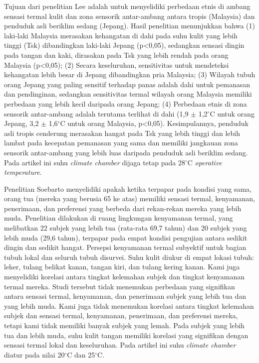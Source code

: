 Tujuan dari penelitian Lee \cite{paper21JYLee} adalah untuk menyelidiki perbedaan etnis di ambang sensasi termal kulit dan zona sensorik antar-ambang antara tropis (Malaysia) dan penduduk asli beriklim sedang (Jepang). Hasil penelitian menunjukkan bahwa (1) laki-laki Malaysia merasakan kehangatan di dahi pada suhu kulit yang lebih tinggi (Tsk) dibandingkan laki-laki Jepang (p<0,05), sedangkan sensasi dingin pada tangan dan kaki, dirasakan pada Tsk yang lebih rendah pada orang Malaysia (p<0,05); (2) Secara keseluruhan, sensitivitas untuk mendeteksi kehangatan lebih besar di Jepang dibandingkan pria Malaysia; (3) Wilayah tubuh orang Jepang yang paling sensitif terhadap panas adalah dahi untuk pemanasan dan pendinginan, sedangkan sensitivitas termal wilayah orang Malaysia memiliki perbedaan yang lebih kecil daripada orang Jepang; (4) Perbedaan etnis di zona sensorik antar-ambang adalah terutama terlihat di dahi (1,9 $\pm$ 1,2$^\circ$C untuk orang Jepang, 3,2 $\pm$ 1,6$^\circ$C untuk orang Malaysia, p<0,05). Kesimpulannya, penduduk asli tropis cenderung merasakan hangat pada Tsk yang lebih tinggi dan lebih lambat pada kecepatan pemanasan yang sama dan memiliki jangkauan zona sensorik antar-ambang yang lebih luas daripada penduduk asli beriklim sedang. Pada artikel ini suhu \textit{climate chamber} dijaga tetap pada 28$^\circ$C \textit{operative temperature}.

Penelitian Soebarto \cite{paper21Veronica} menyelidiki apakah ketika terpapar pada kondisi yang sama, orang tua (mereka yang berusia 65 ke atas) memiliki sensasi termal, kenyamanan, penerimaan, dan preferensi yang berbeda dari rekan-rekan mereka yang lebih muda. Penelitian dilakukan di ruang lingkungan kenyamanan termal, yang melibatkan 22 subjek yang lebih tua (rata-rata 69,7 tahun) dan 20 subjek yang lebih muda (29,6 tahun), terpapar pada empat kondisi pengujian antara sedikit dingin dan sedikit hangat. Persepsi kenyamanan termal subyektif untuk bagian tubuh lokal dan seluruh tubuh disurvei. Suhu kulit diukur di empat lokasi tubuh: leher, tulang belikat kanan, tangan kiri, dan tulang kering kanan. Kami juga menyelidiki korelasi antara tingkat kelemahan subjek dan tingkat kenyamanan termal mereka. Studi tersebut tidak menemukan perbedaan yang signifikan antara sensasi termal, kenyamanan, dan penerimaan subjek yang lebih tua dan yang lebih muda. Kami juga tidak menemukan korelasi antara tingkat kelemahan subjek dan sensasi termal, kenyamanan, penerimaan, dan preferensi mereka, tetapi kami tidak memiliki banyak subjek yang lemah. Pada subjek yang lebih tua dan lebih muda, suhu kulit tangan memiliki korelasi yang signifikan dengan sensasi termal lokal dan keseluruhan. Pada artikel ini suhu \textit{climate chamber} diatur pada nilai 20$^\circ$C dan 25$^\circ$C.


